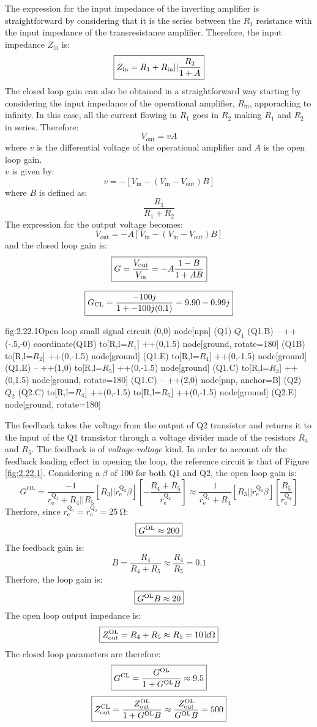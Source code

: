The expression for the input impedance of the inverting amplifier is straightforward by considering that it is the series between the $R_1$ resistance with the input impedance of the transresistance amplifier. Therefore, the input impedance $Z_{\text{in}}$ is:
\[\boxed{Z_\text{in}=R_1+R_\text{in}||\frac{R_2}{1+A}}\]
The closed loop gain can also be obtained in a straightforward way starting by considering the input impedance of the operational amplifier, $R_\text{in}$, apporaching to infinity. In this case, all the current flowing in $R_1$ goes in $R_2$ making $R_1$ and $R_2$ in series. Therefore:
\[V_\text{out}=vA\]
where $v$ is the differential voltage of the operational amplifier and $A$ is the open loop gain.\\
$v$ is given by:
\[v=-[V_\text{in}-(V_\text{in}-V_\text{out})B]\]
where $B$ is defined as:
\[\frac{R_1}{R_1+R_2}\]
The expression for the output voltage becomes:
\[V_\text{out}=-A[V_\text{in}-(V_\text{in}-V_\text{out})B]\]
and the closed loop gain is:
\[\boxed{G=\frac{V_\text{out}}{V_\text{in}}=-A\frac{1-B}{1+AB}}\]

\[\boxed{G_{\text{CL}}=\frac{-100j}{1+-100j(0.1)}=9.90-0.99j}\]

\begin{circuit}{fig:2.22.1}{Open loop small signal circuit}
    (0,0) node[npn] (Q1) {$Q_1$}
    (Q1.B) -- ++(-.5,-0) coordinate(Q1B)
    to[R,l=$R_1$] ++(0,1.5)
    node[ground, rotate=180] {}
    (Q1B) to[R,l=$R_2$] ++(0,-1.5)
    node[ground] {}
    (Q1.E) to[R,l=$R_4$] ++(0,-1.5)
    node[ground] {}
    (Q1.E) -- ++(1,0)
    to[R,l=$R_5$] ++(0,-1.5)
    node[ground] {}
    (Q1.C) to[R,l=$R_3$] ++(0,1.5)
    node[ground, rotate=180] {}
    (Q1.C) -- ++(2,0)
    node[pnp, anchor=B] (Q2) {$Q_2$}
    (Q2.C) to[R,l=$R_4$] ++(0,-1.5)
    to[R,l=$R_5$] ++(0,-1.5)
    node[ground] {}
    (Q2.E) node[ground, rotate=180] {}
\end{circuit}
The feedback takes the voltage from the output of Q2 transistor and returns it to the input of the Q1 transistor through a voltage divider made of the resistors $R_4$ and $R_5$. The feedback is of \textit{voltage-voltage} kind. In order to account ofr the feedback loading effect in opening the loop, the reference circuit is that of Figure \ref{fig:2.22.1}. Considering a $\beta$ of 100 for both Q1 and Q2, the open loop gain is:
\[G^{\text{OL}}=\frac{-1}{r_\text{e}^{\text{Q}_1}+R_4||R_5}\left[R_3||r_\text{e}^{\text{Q}_2}\beta\right]\left[-\frac{R_4+R_5}{r_\text{e}^{\text{Q}_2}}\right]\approx\frac{1}{r_\text{e}^{\text{Q}_1}+R_4}\left[R_3||r_\text{e}^{\text{Q}_2}\beta\right]\left[\frac{R_5}{r_\text{e}^{\text{Q}_2}}\right]\]
Therfore, since $r_\text{e}^{\text{Q}_1} = r_\text{e}^{\text{Q}_2}=\SI{25}{\ohm}$:
\[\boxed{G^{\text{OL}}\approx200}\]
The feedback gain is:
\[B=\frac{R_4}{R_4+R_5}\approx\frac{R_4}{R_5}=0.1\]
Therfore, the loop gain is:
\[\boxed{G^{\text{OL}}B\approx20}\]
The open loop output impedance is:
\[\boxed{Z_\text{out}^\text{OL}=R_4+R_5\approx R_5=\SI{10}{\kilo\ohm}}\]
The closed loop parameters are therefore:
\[\boxed{G^\text{CL}=\frac{G^\text{OL}}{1+G^\text{OL}B}\approx9.5}\]
\[\boxed{Z_\text{out}^\text{CL}=\frac{Z_\text{out}^\text{OL}}{1+G^\text{OL}B}\approx\frac{Z_\text{out}^\text{OL}}{G^\text{OL}B}=500}\]


